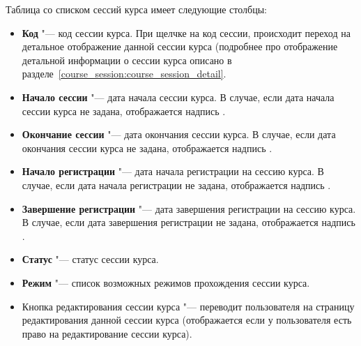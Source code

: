 \begin{itemize}
		Таблица со списком сессий курса имеет следующие столбцы:
		\begin{itemize}
			\item \textbf{Код} "--- код сессии курса. При щелчке на код сессии, происходит переход на детальное отображение данной сессии курса (подробнее про отображение детальной информации о сессии курса описано в разделе~\ref{course_session:course_session_detail}.
			\item \textbf{Начало сессии} "--- дата начала сессии курса. В случае, если дата начала сессии курса не задана, отображается надпись .
			\item \textbf{Окончание сессии} "--- дата окончания сессии курса. В случае, если дата окончания сессии курса не задана, отображается надпись .
			\item \textbf{Начало регистрации} "--- дата начала регистрации на сессию курса. В случае, если дата начала регистрации не задана, отображается надпись .
			\item \textbf{Завершение регистрации} "--- дата завершения регистрации на сессию курса. В случае, если дата завершения регистрации не задана, отображается надпись .
			\item \textbf{Статус} "--- статус сессии курса.
			\item \textbf{Режим} "--- список возможных режимов прохождения сессии курса.
			\item Кнопка редактирования сессии курса  "--- переводит пользователя на страницу редактирования данной сессии курса (отображается если у пользователя есть право на редактирование сессии курса).
		\end{itemize}
	\end{itemize}
